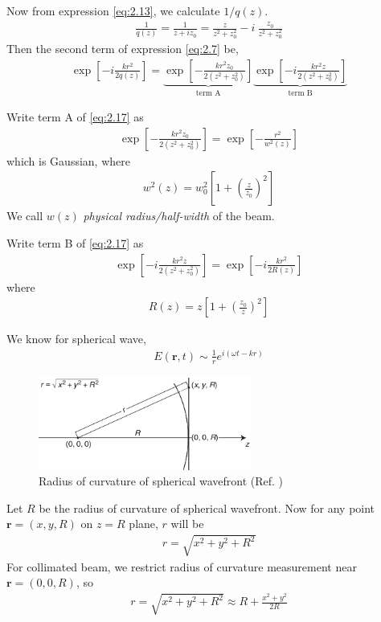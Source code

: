 \documentclass[11pt,a4paper]{article}
\numberwithin{equation}{section}
\begin{document}
Now from expression \ref{eq:2.13}, we calculate $1/q(z)$.
\begin{align}
	\frac{1}{q(z)} = \frac{1}{z + iz_0} = \frac{z}{z^2 + z_0^2} - i\:\frac{z_0}{z^2 + z_0^2} \label{eq:2.16}
\end{align}
Then the second term of expression \ref{eq:2.7} be,
\begin{align}
	\exp\left[-i\frac{kr^2}{2q(z)}\right] = 
	\underbrace{\exp\left[-\frac{kr^2z_0}{2(z^2 + z_0^2)}\right]}_{\text{term A}}
	\underbrace{\exp\left[-i\frac{kr^2z}{2(z^2 + z_0^2)}\right]}_{\text{term B}} 
	\label{eq:2.17}
\end{align}

Write term A of \ref{eq:2.17} as 
\begin{align}
	\exp\left[-\frac{kr^2z_0}{2(z^2 + z_0^2)}\right] = \exp\left[-\frac{r^2}{w^2(z)}\right]
\end{align}
which is Gaussian, where
\begin{align}
	\boxed{w^2(z)= w_0^2\left[1+\left(\frac{z}{z_0}\right)^2\right]} \label{eq:2.19}
\end{align}
We call $w(z)$ \textit{physical radius/half-width} of the beam.

Write term B of \ref{eq:2.17} as 
\begin{align}
	\exp\left[-i\frac{kr^2z}{2(z^2 + z_0^2)}\right] = \exp\left[-i\frac{kr^2}{2 R(z)}\right]
\end{align}
where
\begin{align}
	\boxed{R(z)= z\left[1+\left(\frac{z_0}{z}\right)^2\right]} \label{eq:2.21}
\end{align}

We know for spherical wave,
\begin{align}
	{E}(\boldsymbol{r},t) \sim \frac{1}{r} e^{i(\omega t -kr)} \label{eq:2.22}
\end{align}

\begin{figure}[H]
	\centering
	\includegraphics[width=7cm]{spherical wave.png}
	\caption{Radius of curvature of spherical wavefront (Ref. \cite{milonni})}
	\label{fig:sp wave}
\end{figure}
Let $R$ be the radius of curvature of spherical wavefront. 
Now for any point $\boldsymbol{r}=(x,y,R)$ on $z=R$ plane, $r$ will be
\begin{align}
	r=\sqrt{x^2+y^2+R^2}
\end{align}
For collimated beam, we restrict radius of curvature measurement near $\boldsymbol{r}=(0,0,R)$, so
\begin{align}
	r=\sqrt{x^2+y^2+R^2}\approx R + \frac{x^2+y^2}{2R}
\end{align}
\end{document}

